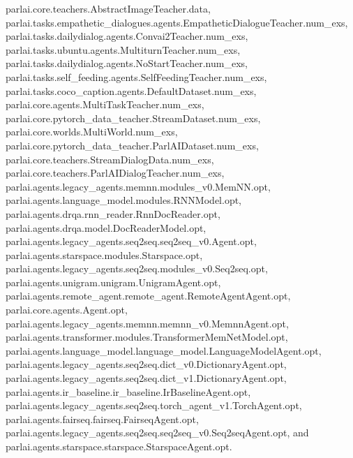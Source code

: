 parlai.\+core.\+teachers.\+Abstract\+Image\+Teacher.\+data, parlai.\+tasks.\+empathetic\+\_\+dialogues.\+agents.\+Empathetic\+Dialogue\+Teacher.\+num\+\_\+exs, parlai.\+tasks.\+dailydialog.\+agents.\+Convai2\+Teacher.\+num\+\_\+exs, parlai.\+tasks.\+ubuntu.\+agents.\+Multiturn\+Teacher.\+num\+\_\+exs, parlai.\+tasks.\+dailydialog.\+agents.\+No\+Start\+Teacher.\+num\+\_\+exs, parlai.\+tasks.\+self\+\_\+feeding.\+agents.\+Self\+Feeding\+Teacher.\+num\+\_\+exs, parlai.\+tasks.\+coco\+\_\+caption.\+agents.\+Default\+Dataset.\+num\+\_\+exs, parlai.\+core.\+agents.\+Multi\+Task\+Teacher.\+num\+\_\+exs, parlai.\+core.\+pytorch\+\_\+data\+\_\+teacher.\+Stream\+Dataset.\+num\+\_\+exs, parlai.\+core.\+worlds.\+Multi\+World.\+num\+\_\+exs, parlai.\+core.\+pytorch\+\_\+data\+\_\+teacher.\+Parl\+A\+I\+Dataset.\+num\+\_\+exs, parlai.\+core.\+teachers.\+Stream\+Dialog\+Data.\+num\+\_\+exs, parlai.\+core.\+teachers.\+Parl\+A\+I\+Dialog\+Teacher.\+num\+\_\+exs, parlai.\+agents.\+legacy\+\_\+agents.\+memnn.\+modules\+\_\+v0.\+Mem\+N\+N.\+opt, parlai.\+agents.\+language\+\_\+model.\+modules.\+R\+N\+N\+Model.\+opt, parlai.\+agents.\+drqa.\+rnn\+\_\+reader.\+Rnn\+Doc\+Reader.\+opt, parlai.\+agents.\+drqa.\+model.\+Doc\+Reader\+Model.\+opt, parlai.\+agents.\+legacy\+\_\+agents.\+seq2seq.\+seq2seq\+\_\+v0.\+Agent.\+opt, parlai.\+agents.\+starspace.\+modules.\+Starspace.\+opt, parlai.\+agents.\+legacy\+\_\+agents.\+seq2seq.\+modules\+\_\+v0.\+Seq2seq.\+opt, parlai.\+agents.\+unigram.\+unigram.\+Unigram\+Agent.\+opt, parlai.\+agents.\+remote\+\_\+agent.\+remote\+\_\+agent.\+Remote\+Agent\+Agent.\+opt, parlai.\+core.\+agents.\+Agent.\+opt, parlai.\+agents.\+legacy\+\_\+agents.\+memnn.\+memnn\+\_\+v0.\+Memnn\+Agent.\+opt, parlai.\+agents.\+transformer.\+modules.\+Transformer\+Mem\+Net\+Model.\+opt, parlai.\+agents.\+language\+\_\+model.\+language\+\_\+model.\+Language\+Model\+Agent.\+opt, parlai.\+agents.\+legacy\+\_\+agents.\+seq2seq.\+dict\+\_\+v0.\+Dictionary\+Agent.\+opt, parlai.\+agents.\+legacy\+\_\+agents.\+seq2seq.\+dict\+\_\+v1.\+Dictionary\+Agent.\+opt, parlai.\+agents.\+ir\+\_\+baseline.\+ir\+\_\+baseline.\+Ir\+Baseline\+Agent.\+opt, parlai.\+agents.\+legacy\+\_\+agents.\+seq2seq.\+torch\+\_\+agent\+\_\+v1.\+Torch\+Agent.\+opt, parlai.\+agents.\+fairseq.\+fairseq.\+Fairseq\+Agent.\+opt, parlai.\+agents.\+legacy\+\_\+agents.\+seq2seq.\+seq2seq\+\_\+v0.\+Seq2seq\+Agent.\+opt, and parlai.\+agents.\+starspace.\+starspace.\+Starspace\+Agent.\+opt.

\mbox{\label{classparlai_1_1tasks_1_1ubuntu_1_1agents_1_1MultiturnTeacher_a4d2d163664a969a28ba9171f5d2a5ce7}} 
